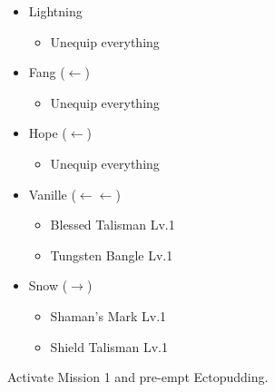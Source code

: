 \begin{menu}
\begin{itemize}
\begin{itemize}
		\end{itemize}
		\equip
		\begin{itemize}
			\item Lightning
				\begin{itemize}
					\item Unequip everything
				\end{itemize}
			\item Fang ($\leftarrow$)
				\begin{itemize}
					\item Unequip everything
				\end{itemize}
			\item Hope ($\leftarrow$)
				\begin{itemize}
					\item Unequip everything
				\end{itemize}
			\item Vanille ($\leftarrow\leftarrow$)
			      \begin{itemize}
				      \item Blessed Talisman Lv.1
				      \item Tungsten Bangle Lv.1
			      \end{itemize}
			\item Snow ($\rightarrow$)
			      \begin{itemize}
				      \item Shaman's Mark Lv.1
				      \item Shield Talisman Lv.1
			      \end{itemize}
		\end{itemize}
	\end{itemize}
\end{menu}

Activate Mission 1 and pre-empt Ectopudding.

\renewcommand{\first}{[1] Solidarity (\com/\med/\sen)}
\renewcommand{\second}{[2] Relentless Assault (\com/\rav/\rav)}
\renewcommand{\third}{[3] Premeditation (\syn/\sab/\sen)}
\renewcommand{\fourth}{[4] Bully (\syn/\sab/\com)}
\renewcommand{\fifth}{[5] Devastation (\com/\sab/\com)}
\renewcommand{\sixth}{[6] Dirty Fighting (\com/\sab/\sen)}

